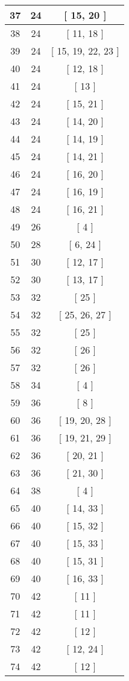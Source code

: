 \begin{center}
\begin{longtable}[H]{|| c c c ||}
37 & 24 & [ 15, 20 ]
\\\hline
38 & 24 & [ 11, 18 ]
\\\hline
39 & 24 & [ 15, 19, 22, 23 ]
\\\hline
40 & 24 & [ 12, 18 ]
\\\hline
41 & 24 & [ 13 ]
\\\hline
42 & 24 & [ 15, 21 ]
\\\hline
43 & 24 & [ 14, 20 ]
\\\hline
44 & 24 & [ 14, 19 ]
\\\hline
45 & 24 & [ 14, 21 ]
\\\hline
46 & 24 & [ 16, 20 ]
\\\hline
47 & 24 & [ 16, 19 ]
\\\hline
48 & 24 & [ 16, 21 ]
\\\hline
49 & 26 & [ 4 ]
\\\hline
50 & 28 & [ 6, 24 ]
\\\hline
51 & 30 & [ 12, 17 ]
\\\hline
52 & 30 & [ 13, 17 ]
\\\hline
53 & 32 & [ 25 ]
\\\hline
54 & 32 & [ 25, 26, 27 ]
\\\hline
55 & 32 & [ 25 ]
\\\hline
56 & 32 & [ 26 ]
\\\hline
57 & 32 & [ 26 ]
\\\hline
58 & 34 & [ 4 ]
\\\hline
59 & 36 & [ 8 ]
\\\hline
60 & 36 & [ 19, 20, 28 ]
\\\hline
61 & 36 & [ 19, 21, 29 ]
\\\hline
62 & 36 & [ 20, 21 ]
\\\hline
63 & 36 & [ 21, 30 ]
\\\hline
64 & 38 & [ 4 ]
\\\hline
65 & 40 & [ 14, 33 ]
\\\hline
66 & 40 & [ 15, 32 ]
\\\hline
67 & 40 & [ 15, 33 ]
\\\hline
68 & 40 & [ 15, 31 ]
\\\hline
69 & 40 & [ 16, 33 ]
\\\hline
70 & 42 & [ 11 ]
\\\hline
71 & 42 & [ 11 ]
\\\hline
72 & 42 & [ 12 ]
\\\hline
73 & 42 & [ 12, 24 ]
\\\hline
74 & 42 & [ 12 ]
\\\hline

\end{longtable}
\end{center}
